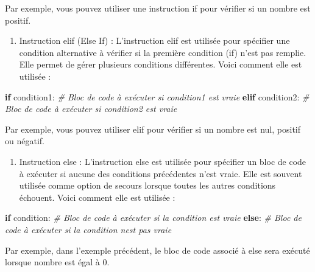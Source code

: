 \documentclass[11pt]{article}
\providecommand{\tightlist}{%
      \setlength{\itemsep}{0pt}\setlength{\parskip}{0pt}}
\newenvironment{Shaded}{}{}
\newcommand{\CommentTok}[1]{\textcolor[rgb]{0.38,0.63,0.69}{\textit{{#1}}}}
\newcommand{\NormalTok}[1]{{#1}}
\newcommand{\ControlFlowTok}[1]{\textcolor[rgb]{0.00,0.44,0.13}{\textbf{{#1}}}}
\begin{document}
Par exemple, vous pouvez utiliser une instruction if pour vérifier si un
nombre est positif.

\begin{enumerate}
\def\labelenumi{\arabic{enumi}.}
\setcounter{enumi}{1}
\tightlist
\item
  Instruction elif (Else If) : L'instruction elif est utilisée pour
  spécifier une condition alternative à vérifier si la première
  condition (if) n'est pas remplie. Elle permet de gérer plusieurs
  conditions différentes. Voici comment elle est utilisée :
\end{enumerate}

\begin{Shaded}
\begin{Highlighting}[]

\ControlFlowTok{if}\NormalTok{ condition1:}
    \CommentTok{\# Bloc de code à exécuter si condition1 est vraie}
\ControlFlowTok{elif}\NormalTok{ condition2:}
    \CommentTok{\# Bloc de code à exécuter si condition2 est vraie}
\end{Highlighting}
\end{Shaded}

Par exemple, vous pouvez utiliser elif pour vérifier si un nombre est
nul, positif ou négatif.

\begin{enumerate}
\def\labelenumi{\arabic{enumi}.}
\setcounter{enumi}{2}
\tightlist
\item
  Instruction else : L'instruction else est utilisée pour spécifier un
  bloc de code à exécuter si aucune des conditions précédentes n'est
  vraie. Elle est souvent utilisée comme option de secours lorsque
  toutes les autres conditions échouent. Voici comment elle est utilisée
  :
\end{enumerate}

\begin{Shaded}
\begin{Highlighting}[]

\ControlFlowTok{if}\NormalTok{ condition:}
    \CommentTok{\# Bloc de code à exécuter si la condition est vraie}
\ControlFlowTok{else}\NormalTok{:}
    \CommentTok{\# Bloc de code à exécuter si la condition n\textquotesingle{}est pas vraie}
\end{Highlighting}
\end{Shaded}

Par exemple, dans l'exemple précédent, le bloc de code associé à else
sera exécuté lorsque nombre est égal à 0.
\end{document}
